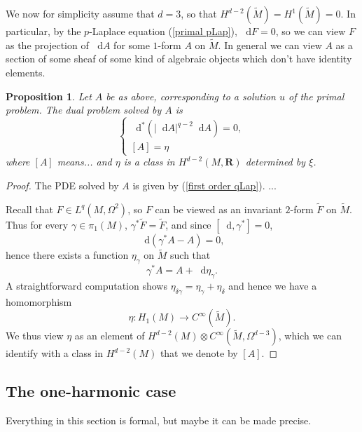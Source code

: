 \documentclass[reqno,12pt]{amsart}
\newcommand{\RR}{\mathbf{R}}
\newcommand*\dif{\mathop{}\!\mathrm{d}}
\newtheorem{proposition}[theorem]{Proposition}
\theoremstyle{definition}
\numberwithin{equation}{section}
\begin{document}
We now for simplicity assume that $d = 3$, so that $H^{d - 2}(\tilde M) = H^1(\tilde M) = 0$.
In particular, by the $p$-Laplace equation (\ref{primal pLap}), $\dif F = 0$, so we can view $F$ as the projection of $\dif A$ for some $1$-form $A$ on $\tilde M$.
In general we can view $A$ as a section of some sheaf of some kind of algebraic objects which don't have identity elements.

\begin{proposition}
Let $A$ be as above, corresponding to a solution $u$ of the primal problem.
The dual problem solved by $A$ is 
\begin{equation}\label{dual qLap}
\begin{cases}
\dif^*(|\dif A|^{q - 2} \dif A) = 0, \\
[A] = \eta
\end{cases}
\end{equation}
where $[A]$ means... and $\eta$ is a class in $H^{d - 2}(M, \RR)$ determined by $\xi$.
\end{proposition}
\begin{proof}
The PDE solved by $A$ is given by (\ref{first order qLap}). ... 


Recall that $F \in L^q(M, \Omega^2)$, so $F$ can be viewed as an invariant $2$-form $\tilde F$ on $\tilde M$.
Thus for every $\gamma \in \pi_1(M)$, $\gamma^* \tilde F = \tilde F$, and since $[\dif, \gamma^*] = 0$,
$$\dif(\gamma^* A - A) = 0,$$
hence there exists a function $\eta_\gamma$ on $\tilde M$ such that 
$$\gamma^* A = A + \dif \eta_\gamma.$$
A straightforward computation shows $\eta_{\delta \gamma} = \eta_\gamma + \eta_\delta$ and hence we have a homomorphism 
$$\eta: H_1(M) \to C^\infty(\tilde M).$$
We thus view $\eta$ as an element of $H^{d - 2}(M) \otimes C^\infty(\tilde M, \Omega^{d - 3})$, which we can identify with a class in $H^{d - 2}(M)$ that we denote by $[A]$.
\end{proof}

\subsection{The one-harmonic case}
Everything in this section is formal, but maybe it can be made precise.
\end{document}
